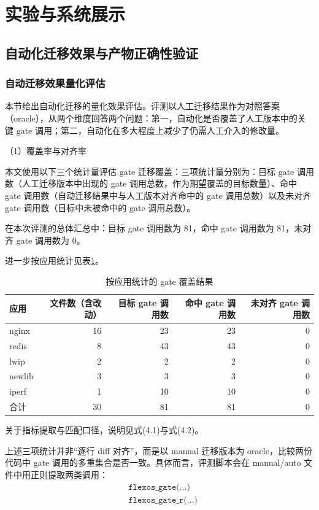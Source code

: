\documentclass[UTF8,a4paper,12pt,twoside]{ctexart}  %
\begin{document}
\newpage
\section{实验与系统展示}

\subsection{自动化迁移效果与产物正确性验证}


\subsubsection{自动迁移效果量化评估}
本节给出自动化迁移的量化效果评估。评测以人工迁移结果作为对照答案（oracle），从两个维度回答两个问题：第一，自动化是否覆盖了人工版本中的关键
gate 调用；第二，自动化在多大程度上减少了仍需人工介入的修改量。

（1）覆盖率与对齐率

本文使用以下三个统计量评估 gate 迁移覆盖：三项统计量分别为：目标 gate 调用数（人工迁移版本中出现的 gate
调用总数，作为期望覆盖的目标数量）、命中 gate
调用数（自动迁移结果中与人工版本对齐命中的 gate 调用总数）以及未对齐
gate 调用数（目标中未被命中的 gate 调用总数）。

在本次评测的总体汇总中：目标 gate 调用数为 81，命中 gate 调用数为
81，未对齐 gate 调用数为 0。

进一步按应用统计见表\ref{tab:gate-coverage-by-app}。
{\small
\setlength{\tabcolsep}{4pt}
\begin{longtable}{@{}lrrrr@{}}
\caption{按应用统计的 gate 覆盖结果}\label{tab:gate-coverage-by-app}\\
\toprule
应用 & 文件数（含改动） & 目标 gate 调用数 & 命中 gate 调用数 & 未对齐
gate 调用数 \\
\midrule
\endhead
\bottomrule
\endlastfoot
nginx & 16 & 23 & 23 & 0 \\
redis & 8 & 43 & 43 & 0 \\
lwip & 2 & 2 & 2 & 0 \\
newlib & 3 & 3 & 3 & 0 \\
iperf & 1 & 10 & 10 & 0 \\
合计 & 30 & 81 & 81 & 0 \\
\end{longtable}
}

关于指标提取与匹配口径，说明见式(4.1)与式(4.2)。

上述三项统计并非``逐行 diff 对齐''，而是以 manual 迁移版本为
oracle，比较两份代码中 gate
调用的多重集合是否一致。具体而言，评测脚本会在 manual/auto
文件中用正则提取两类调用：
\begin{equation}
\begin{aligned}
&\texttt{flexos\_gate(\ldots)} \\
&\texttt{flexos\_gate\_r(\ldots)}
\end{aligned}
\end{equation}
\end{document}
